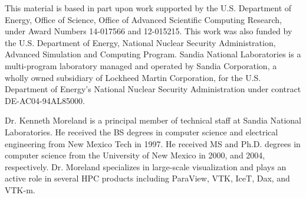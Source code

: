 \documentclass[letterpaper,twocolumn,fleqn]{article}
\begin{document}
This material is based in part upon work supported by the U.S. Department
of Energy, Office of Science, Office of Advanced Scientific Computing
Research, under Award Numbers 14-017566 and 12-015215. This work was also
funded by the U.S. Department of Energy, National Nuclear Security
Administration, Advanced Simulation and Computing Program. Sandia National
Laboratories is a multi-program laboratory managed and operated by Sandia
Corporation, a wholly owned subsidiary of Lockheed Martin Corporation, for
the U.S. Department of Energy's National Nuclear Security Administration
under contract DE-AC04-94AL85000.


\small



\begin{biography}
\noindent
Dr. Kenneth Moreland is a principal member of technical staff at Sandia
National Laboratories. He received the BS degrees in computer science and
electrical engineering from New Mexico Tech in 1997. He received MS and
Ph.D. degrees in computer science from the University of New Mexico in
2000, and 2004, respectively. Dr. Moreland specializes in large-scale
visualization and plays an active role in several HPC products including
ParaView, VTK, IceT, Dax, and VTK-m.
\end{biography}
\end{document}
